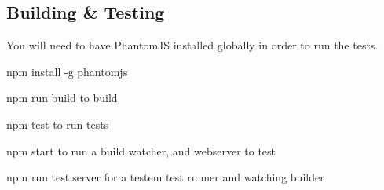 \subsection*{Building \& Testing}

You will need to have Phantom\+JS installed globally in order to run the tests.

{\ttfamily npm install -\/g phantomjs}


\begin{DoxyItemize}
\item {\ttfamily npm run build} to build
\item {\ttfamily npm test} to run tests
\item {\ttfamily npm start} to run a build watcher, and webserver to test
\item {\ttfamily npm run test\+:server} for a testem test runner and watching builder 
\end{DoxyItemize}